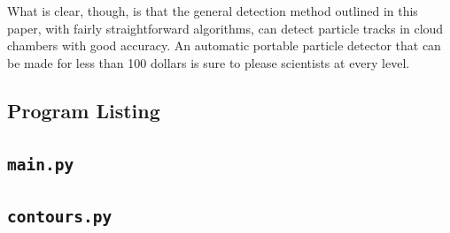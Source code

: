 \documentclass[notitlepage]{article}
\begin{document}
What is clear, though, is that the general detection method outlined in this paper, with fairly straightforward algorithms, can detect particle tracks in cloud chambers with good accuracy.  An automatic portable particle detector that can be made for less than 100 dollars is sure to please scientists at every level.

\begin{appendices}

\clearpage

\section{Program Listing}
\subsection{\texttt{main.py}}


\clearpage

\subsection{\texttt{contours.py}}


\clearpage


\end{appendices}
\end{document}
